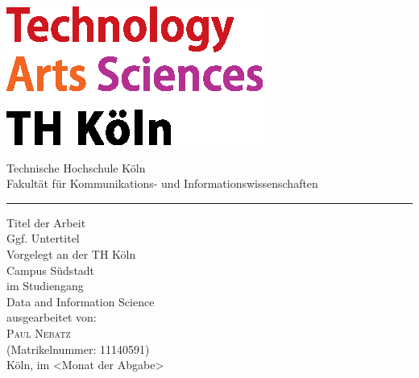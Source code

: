 \pagestyle{empty}
  \begin{titlepage}
    \includegraphics[scale=1.00]{sources/logo_TH-Koeln_CMYK_22pt.eps}\\
    \begin{center}
      \Large
      Technische Hochschule Köln\\
      Fakultät für Kommunikations- und Informationswissenschaften\\
      \vspace{0.5cm}
      \hrule\par\rule{0pt}{2cm} %
      \huge
      Titel der Arbeit\\
      \Large
      Ggf. Untertitel\\
      \vspace{1.5cm}
      \large
      Vorgelegt an der TH Köln\\
      Campus Südstadt\\
      im Studiengang\\
      Data and Information Science\\ 
      \vspace{1.0cm}
      ausgearbeitet von:\\
      \textsc{Paul Nebatz}\\
      (Matrikelnummer: 11140591)\\
      \vspace{1.5cm}
      Köln, im <Monat der Abgabe>
    \end{center}    
  \end{titlepage}
  \newpage